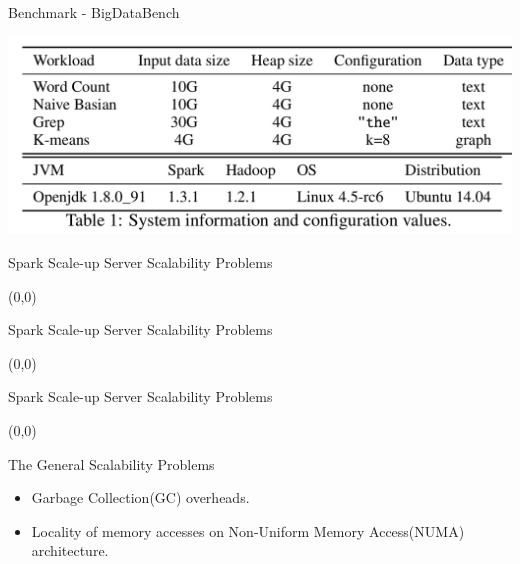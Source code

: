 \documentclass[english]{beamer} %
\begin{document}
\begin{frame}{Benchmark - BigDataBench}
\begin{center}
\includegraphics[scale=0.5]{fig/benchmark}
\end{center}
\end{frame}

\begin{frame}{Spark Scale-up Server Scalability Problems}
\begin{textblock}{1}(0,0)
\end{textblock} 
\end{frame}

\begin{frame}{Spark Scale-up Server Scalability Problems}
\begin{textblock}{1}(0,0)
\end{textblock} 
\end{frame}

\begin{frame}{Spark Scale-up Server Scalability Problems}
\begin{textblock}{1}(0,0)
\end{textblock} 
\end{frame}

\begin{frame}{The General Scalability Problems}
    \begin{itemize}[<+-| alert@+>]
    \item Garbage Collection(GC) overheads.
    \item Locality of memory accesses on Non-Uniform Memory Access(NUMA)
    architecture.
    \end{itemize}
\end{frame}
\end{document}
